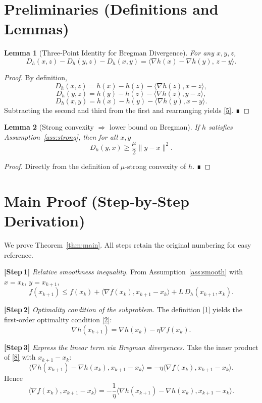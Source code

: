 \documentclass{article}
\newtheorem{lemma}{Lemma}
\newcommand{\grad}{\nabla}
\newcommand{\Breg}{D_{h}}
\begin{document}
\section*{Preliminaries (Definitions and Lemmas)}
\begin{lemma}[Three‑Point Identity for Bregman Divergence]\label{lem:3pt}
For any $x,y,z$,
\[
\Breg (x,z)-\Breg (y,z)-\Breg (x,y)=\langle \grad h(x)-\grad h(y),\,z-y\rangle .
\tag{5}
\]
\end{lemma}
\begin{proof}
By definition,
\[
\Breg (x,z)=h(x)-h(z)-\langle \grad h(z),x-z\rangle,
\]
\[
\Breg (y,z)=h(y)-h(z)-\langle \grad h(z),y-z\rangle,
\]
\[
\Breg (x,y)=h(x)-h(y)-\langle \grad h(y),x-y\rangle .
\]
Subtracting the second and third from the first and rearranging yields \eqref{5}. ∎
\end{proof}

\begin{lemma}[Strong convexity $\Rightarrow$ lower bound on Bregman]\label{lem:strong}
If $h$ satisfies Assumption~\ref{ass:strong}, then for all $x,y$
\[
\Breg (y,x)\ge\frac{\mu}{2}\|y-x\|^{2}.
\tag{6}
\]
\end{lemma}
\begin{proof}
Directly from the definition of $\mu$‑strong convexity of $h$. ∎
\end{proof}

\section*{Main Proof (Step‑by‑Step Derivation)}
We prove Theorem~\ref{thm:main}. All steps retain the original numbering for easy reference.

\bigskip
\noindent\textbf{[Step 1]} \emph{Relative smoothness inequality.}  
From Assumption~\ref{ass:smooth} with $x=x_k$, $y=x_{k+1}$,
\[
f(x_{k+1})\le f(x_k)+\langle \grad f(x_k),x_{k+1}-x_k\rangle+L\,\Breg (x_{k+1},x_k).
\tag{7}
\]

\noindent\textbf{[Step 2]} \emph{Optimality condition of the subproblem.}  
The definition \eqref{1} yields the first‑order optimality condition \eqref{2}:
\[
\grad h(x_{k+1}) = \grad h(x_k)-\eta \grad f(x_k).
\tag{8}
\]

\noindent\textbf{[Step 3]} \emph{Express the linear term via Bregman divergences.}  
Take the inner product of \eqref{8} with $x_{k+1}-x_k$:
\[
\langle \grad h(x_{k+1})-\grad h(x_k),x_{k+1}-x_k\rangle
   = -\eta \langle \grad f(x_k),x_{k+1}-x_k\rangle .
\tag{9}
\]
Hence
\[
\langle \grad f(x_k),x_{k+1}-x_k\rangle
   = -\frac{1}{\eta}\langle \grad h(x_{k+1})-\grad h(x_k),x_{k+1}-x_k\rangle .
\tag{10}
\]
\end{document}
